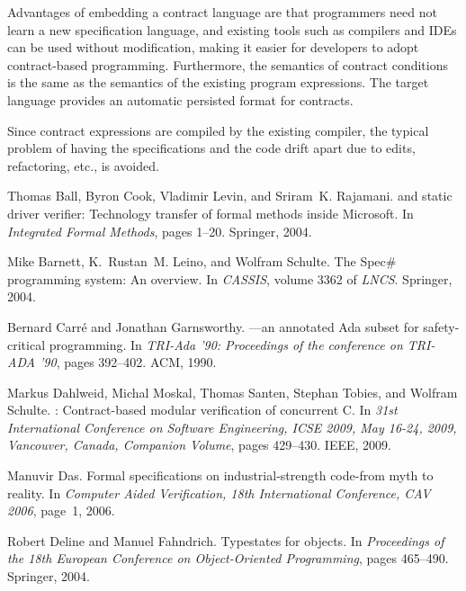 \documentclass{sig-alternate}
\begin{document}
Advantages of embedding a contract language are that programmers need
not learn a new specification language, and existing tools such
as compilers and IDEs can be used without modification, making it
easier for developers to adopt contract-based
programming. Furthermore, the semantics of contract conditions is the
same as the semantics of the existing program expressions. The target
language provides an automatic persisted format for contracts.

Since contract expressions are compiled by the existing compiler, the
typical problem of having the specifications and the code drift apart
due to edits, refactoring, etc., is avoided.



%
\begin{thebibliography}{10}

Thomas Ball, Byron Cook, Vladimir Levin, and Sriram~K. Rajamani.
 and static driver verifier: Technology transfer of formal
  methods inside {Microsoft}.
\newblock In {\em Integrated Formal Methods}, pages 1--20. Springer, 2004.

Mike Barnett, K.~Rustan~M. Leino, and Wolfram Schulte.
\newblock The {Spec\#} programming system: An overview.
\newblock In {\em CASSIS}, volume 3362 of {\em LNCS}. Springer, 2004.

Bernard Carr\'{e} and Jonathan Garnsworthy.
---an annotated {Ada} subset for safety-critical programming.
\newblock In {\em TRI-Ada '90: Proceedings of the conference on TRI-ADA '90},
  pages 392--402. ACM, 1990.

Markus Dahlweid, Michal Moskal, Thomas Santen, Stephan Tobies, and Wolfram
  Schulte.
: Contract-based modular verification of concurrent {C}.
\newblock In {\em 31st International Conference on Software Engineering, ICSE
  2009, May 16-24, 2009, Vancouver, Canada, Companion Volume}, pages 429--430.
  IEEE, 2009.

Manuvir Das.
\newblock Formal specifications on industrial-strength code-from myth to
  reality.
\newblock In {\em Computer Aided Verification, 18th International Conference,
  CAV 2006}, page~1, 2006.

Robert Deline and Manuel Fahndrich.
\newblock Typestates for objects.
\newblock In {\em Proceedings of the 18th European Conference on
  Object-Oriented Programming}, pages 465--490. Springer, 2004.


\end{thebibliography}
\end{document}
